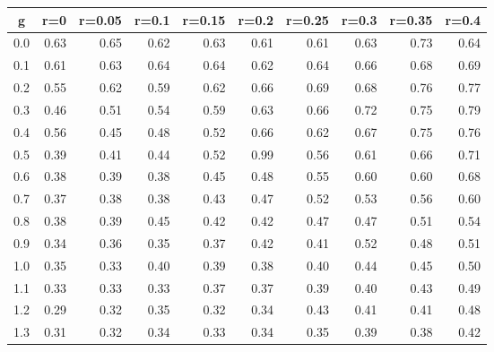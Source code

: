 %
\begin{table}[!tbp]
 \begin{center}
 \begin{tabular}{rrrrrrrrrr}\hline\hline
\multicolumn{1}{c}{g}&\multicolumn{1}{c}{r=0}&\multicolumn{1}{c}{r=0.05}&\multicolumn{1}{c}{r=0.1}&\multicolumn{1}{c}{r=0.15}&\multicolumn{1}{c}{r=0.2}&\multicolumn{1}{c}{r=0.25}&\multicolumn{1}{c}{r=0.3}&\multicolumn{1}{c}{r=0.35}&\multicolumn{1}{c}{r=0.4}\tabularnewline
\hline
0.0&0.63&0.65&0.62&0.63&0.61&0.61&0.63&0.73&0.64\tabularnewline
0.1&0.61&0.63&0.64&0.64&0.62&0.64&0.66&0.68&0.69\tabularnewline
0.2&0.55&0.62&0.59&0.62&0.66&0.69&0.68&0.76&0.77\tabularnewline
0.3&0.46&0.51&0.54&0.59&0.63&0.66&0.72&0.75&0.79\tabularnewline
0.4&0.56&0.45&0.48&0.52&0.66&0.62&0.67&0.75&0.76\tabularnewline
0.5&0.39&0.41&0.44&0.52&0.99&0.56&0.61&0.66&0.71\tabularnewline
0.6&0.38&0.39&0.38&0.45&0.48&0.55&0.60&0.60&0.68\tabularnewline
0.7&0.37&0.38&0.38&0.43&0.47&0.52&0.53&0.56&0.60\tabularnewline
0.8&0.38&0.39&0.45&0.42&0.42&0.47&0.47&0.51&0.54\tabularnewline
0.9&0.34&0.36&0.35&0.37&0.42&0.41&0.52&0.48&0.51\tabularnewline
1.0&0.35&0.33&0.40&0.39&0.38&0.40&0.44&0.45&0.50\tabularnewline
1.1&0.33&0.33&0.33&0.37&0.37&0.39&0.40&0.43&0.49\tabularnewline
1.2&0.29&0.32&0.35&0.32&0.34&0.43&0.41&0.41&0.48\tabularnewline
1.3&0.31&0.32&0.34&0.33&0.34&0.35&0.39&0.38&0.42\tabularnewline
\hline
\end{tabular}

\end{center}

\end{table}

